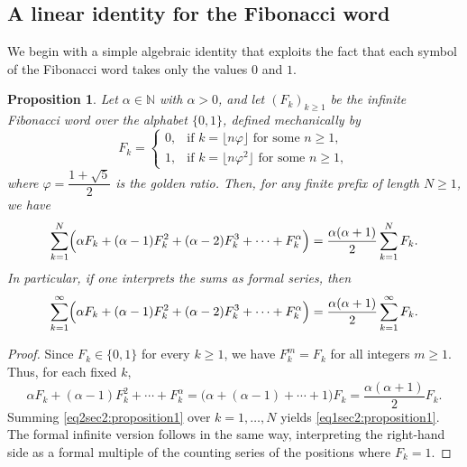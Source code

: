 \documentclass[12pt, a4paper]{article}
\newtheorem{proposition}{Proposition}[section]
\begin{document}
\subsection{A linear identity for the Fibonacci word}

We begin with a simple algebraic identity that exploits the fact that each symbol of the Fibonacci word takes only the values $0$ and $1$.

\begin{proposition}\label{sec2:proposition1}
Let $\alpha \in \mathbb{N}$ with $\alpha > 0$, and let $(F_k)_{k \ge 1}$ be the infinite Fibonacci word over the alphabet $\{0,1\}$, defined mechanically by
\[
F_k =
\begin{cases}
0, & \text{if } k = \lfloor n\varphi \rfloor \text{ for some } n \ge 1,\\[1mm]
1, & \text{if } k = \lfloor n\varphi^2 \rfloor \text{ for some } n \ge 1,
\end{cases}
\]
where $\varphi = \dfrac{1+\sqrt{5}}{2}$ is the golden ratio. Then, for any finite prefix of length $N \ge 1$, we have
\begin{equation}\label{eq1sec2:proposition1}
\sum_{k=1}^N \Bigl( \alpha F_k + (\alpha-1) F_k^2 + (\alpha-2) F_k^3 + \cdots + F_k^\alpha \Bigr)
= \frac{\alpha(\alpha+1)}{2} \sum_{k=1}^N F_k.
\end{equation}
In particular, if one interprets the sums as formal series, then
\[
\sum_{k=1}^\infty \Bigl( \alpha F_k + (\alpha-1) F_k^2 + (\alpha-2) F_k^3 + \cdots + F_k^\alpha \Bigr)
= \frac{\alpha(\alpha+1)}{2} \sum_{k=1}^\infty F_k.
\]
\end{proposition}

\begin{proof}
Since $F_k \in \{0,1\}$ for every $k \ge 1$, we have $F_k^m = F_k$ for all integers $m \ge 1$. Thus, for each fixed $k$,
\begin{equation}\label{eq2sec2:proposition1}
\alpha F_k + (\alpha-1) F_k^2 + \cdots + F_k^\alpha
= \bigl(\alpha + (\alpha-1) + \cdots + 1\bigr) F_k
= \frac{\alpha(\alpha+1)}{2} F_k.
\end{equation}
Summing \eqref{eq2sec2:proposition1} over $k=1,\dots,N$ yields \eqref{eq1sec2:proposition1}. The formal infinite version follows in the same way, interpreting the right-hand side as a formal multiple of the counting series of the positions where $F_k = 1$.
\end{proof}
\end{document}
